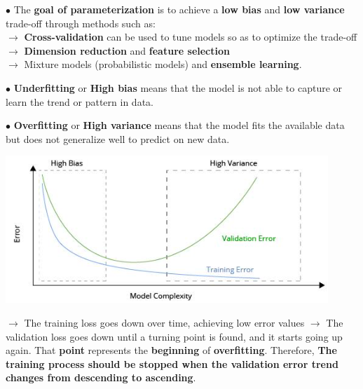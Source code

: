 \documentclass[letterpaper, 10.5pt,landscape]{article}
\begin{document}
\begin{multicols*}{3}
\vspace{3pt}
$\bullet$ The \textbf{goal of parameterization} is to achieve a \textbf{low bias} and \textbf{low variance} trade-off through methods such as:\\
$\rightarrow$ \textbf{Cross-validation} can be used to tune models so as to optimize the trade-off \\
$\rightarrow$ \textbf{Dimension reduction} and \textbf{feature selection} \\
$\rightarrow$ Mixture models (probabilistic models) and \textbf{ensemble learning}. \\

\vspace{3pt}

$\bullet$ \textbf{Underfitting} or \textbf{High bias} means that the model is not able to capture or learn the trend or pattern in data.

$\bullet$ \textbf{Overfitting} or \textbf{High variance} means that the model fits the available data but does not generalize well to predict on new data.


\begin{center}
    \begin{minipage}{0.8\linewidth}
        \includegraphics[width=\textwidth]{figures/Tradeoff_Learning_Curves.PNG}
    \end{minipage}
\end{center}

$\rightarrow$ The training loss goes down over time, achieving low error values
$\rightarrow$ The validation loss goes down until a turning point is found, and it starts going up again. That \textbf{point} represents the \textbf{beginning} of \textbf{overfitting}. Therefore, \textbf{The training process should be stopped when the validation error trend changes from descending to ascending}.





\end{multicols*}
\end{document}
